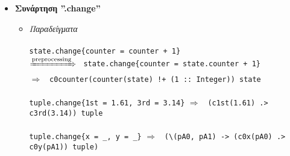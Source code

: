 \documentclass[diploma]{softlab-thesis}
\def\H{Haskell}
\def\lra{$\Longrightarrow$\ }
\def\prarr{$\xRightarrow{\text{preprocessing}}$\ }
\begin{document}
\begin{itemize}
\begin{itemize}
\newpage
\item
\textit{Περιγραφή}\\\\
Οι συναρτήσεις επιθήματος δημιουργούνται αυτόματα από την μετάφραση του
αντίστοιχου ορισμού \verb|tuple_type| ή είναι οι ειδίκες συναρτήσεις επιθήματος
τύπων γινομένων (\verb|_.1st _.2nd| κτλ). Μεταφράζονται σε κανονικές \H\
συναρτήσεις (όπως είναι οι συναρτήσεις προβολής στην \H) με το όρισμά τους
σε παρένθεση. Για τις ειδικές συναρτήσεις τύπων γινομένων προσθέτουμε στην
αρχή ένα 'p' (από το "projection") ώστε να είναι σωστό όνομα \H.
\\\\
Οι συναρτήσεις των τύπων γινομένων είναι πολυμορφικές και λειτουργούν σε
πλειάδες οποιουδήποτε μήκους (για τώρα $\leq$ 5). Αυτό το καταφέρνουμε
με τον ορισμό του παρακάτω class (για το p1st και αντίστοιχων classes για
τα υπόλοιπα):
\begin{verbatim}
class IsFirst' a b | b -> a where
  p1st :: b -> a
\end{verbatim}
Και των παρακάτω instances:

\begin{verbatim}
instance IsFirst' a (a, b) where
  p1st = fst

instance IsFirst' a (a, b, c) where
  p1st = \(a, _, _) -> a

instance IsFirst' a (a, b, c, d) where
  p1st = \(a, _, _, _) -> a

...
\end{verbatim}
\end{itemize}

\item
\textbf{Συνάρτηση ”.change”}

\begin{itemize}
\item
\textit{Παραδείγματα}\\\\
\texttt{state.change\{counter = counter + 1\}}\\
\prarr
\texttt{state.change\{counter = state.counter + 1\}}\\
\lra
\verb|c0counter(counter(state) !+ (1 :: Integer)) state|
\\\\
\texttt{tuple.change\{1st = 1.61, 3rd = 3.14\}} \lra
\texttt{(c1st(1.61) .> c3rd(3.14)) tuple}
\\\\
\verb|tuple.change{x = _, y = _}| \lra
\verb|(\(pA0, pA1) -> (c0x(pA0) .> c0y(pA1)) tuple)| \\


\end{itemize}
\end{itemize}
\end{document}
